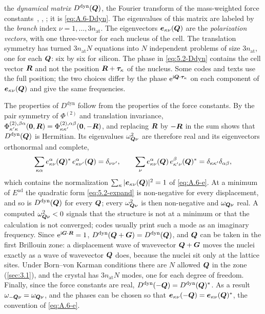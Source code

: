 the \emph{dynamical matrix} $D^{\mathrm{dyn}}(\bm{Q})$, the Fourier transform of the mass-weighted force constants~\cite{born1954dynamical}, \cite[Chaps.~22 and~23]{ashcroft1976solid}, \cite[Eq.~(14)]{giustino2017electron}; it is \cref{eq:A.6-Ddyn}. The eigenvalues of this matrix are labeled by the \emph{branch} index $\nu = 1,\dots,3n_{\mathrm{at}}$. The eigenvectors $\bm{e}_{\kappa\nu}(\bm{Q})$ are the \emph{polarization vectors}, with one three-vector for each nucleus of the cell. The translation symmetry has turned $3n_{\mathrm{at}}N$ equations into $N$ independent problems of size $3n_{\mathrm{at}}$, one for each $\bm{Q}$: six by six for silicon. The phase in \cref{eq:5.2-Ddyn} contains the cell vector $\bm{R}$ and not the position $\bm{R} + \bm{\tau}_\kappa$ of the nucleus. Some codes and texts use the full position; the two choices differ by the phase $\mathrm{e}^{\mathrm{i}\bm{Q}\cdot\bm{\tau}_\kappa}$ on each component of $\bm{e}_{\kappa\nu}(\bm{Q})$ and give the same frequencies.

The properties of $D^{\mathrm{dyn}}$ follow from the properties of the force constants. By the pair symmetry of $\Phi^{(2)}$ and translation invariance, $\Phi^{(2),\beta\alpha}_{\kappa'\kappa}(\bm{0},\bm{R}) = \Phi^{(2),\alpha\beta}_{\kappa\kappa'}(\bm{0},-\bm{R})$, and replacing $\bm{R}$ by $-\bm{R}$ in the sum shows that $D^{\mathrm{dyn}}(\bm{Q})$ is Hermitian. Its eigenvalues $\omega_{\bm{Q}\nu}^2$ are therefore real and its eigenvectors orthonormal and complete,
\begin{equation}
  \sum_{\kappa\alpha}e^{\alpha}_{\kappa\nu}(\bm{Q})^*\,e^{\alpha}_{\kappa\nu'}(\bm{Q}) = \delta_{\nu\nu'} , \qquad
  \sum_\nu e^\alpha_{\kappa\nu}(\bm{Q})\,e^\beta_{\kappa'\nu}(\bm{Q})^* = \delta_{\kappa\kappa'}\delta_{\alpha\beta} ,
  \label{eq:5.2-ortho}
\end{equation}
which contains the normalization $\sum_\kappa|\bm{e}_{\kappa\nu}(\bm{Q})|^2 = 1$ of \cref{eq:A.6-e}. At a minimum of $E^{\mathrm{ad}}$ the quadratic form \cref{eq:5.2-expand} is non-negative for every displacement, and so is $D^{\mathrm{dyn}}(\bm{Q})$ for every $\bm{Q}$; every $\omega_{\bm{Q}\nu}^2$ is then non-negative and $\omega_{\bm{Q}\nu}$ real. A computed $\omega_{\bm{Q}\nu}^2 < 0$ signals that the structure is not at a minimum or that the calculation is not converged; codes usually print such a mode as an imaginary frequency. Since $\mathrm{e}^{\mathrm{i}\bm{G}\cdot\bm{R}} = 1$, $D^{\mathrm{dyn}}(\bm{Q} + \bm{G}) = D^{\mathrm{dyn}}(\bm{Q})$, and $\bm{Q}$ can be taken in the first Brillouin zone: a displacement wave of wavevector $\bm{Q} + \bm{G}$ moves the nuclei exactly as a wave of wavevector $\bm{Q}$ does, because the nuclei sit only at the lattice sites. Under Born--von Karman conditions there are $N$ allowed $\bm{Q}$ in the zone (\cref{sec:3.1}), and the crystal has $3n_{\mathrm{at}}N$ modes, one for each degree of freedom. Finally, since the force constants are real, $D^{\mathrm{dyn}}(-\bm{Q}) = D^{\mathrm{dyn}}(\bm{Q})^*$. As a result $\omega_{-\bm{Q}\nu} = \omega_{\bm{Q}\nu}$, and the phases can be chosen so that $\bm{e}_{\kappa\nu}(-\bm{Q}) = \bm{e}_{\kappa\nu}(\bm{Q})^*$, the convention of \cref{eq:A.6-e}.

